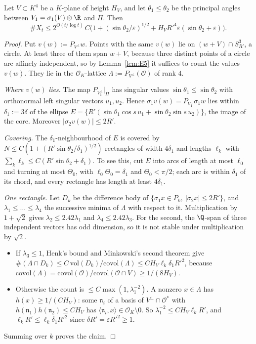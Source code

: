 \begin{lemma}\label{lem:G1}
Let $V\subset K^4$ be a $K$-plane of height $H_V$, and let $\theta_1\le\theta_2$ be the principal angles between
$V_1=\sigma_1(V)\otimes\R$ and $\Pi$. Then
\[
\#X_t\le2^{O(t/\log t)}\,C\big(1+(\sin\theta_2/\varepsilon)^{1/2}+H_VR'^4\varepsilon(\sin\theta_2+\varepsilon)\big).
\]
\end{lemma}
\begin{proof}
Put $v(w):=P_{V^\perp}w$. Points with the same $v(w)$ lie on $(w+V)\cap S^3_{R'}$, a circle. At least three of them span $w+V$, because
three distinct points of a circle are affinely independent, so by Lemma~\ref{lem:E5} it suffices to count the values $v(w)$. They lie in the $\mathcal O_K$-lattice
$\Lambda:=P_{V^\perp}(\mathcal O)$ of rank $4$.

\emph{Where $v(w)$ lies.} The map $P_{V_1^\perp}|_\Pi$ has singular values $\sin\theta_1\le\sin\theta_2$ with
orthonormal left singular vectors $u_1,u_2$. Hence $\sigma_1v(w)=P_{V_1^\perp}\sigma_1w$ lies within
$\delta_1:=3\delta$ of the ellipse $E=\{R'(\sin\theta_1\cos s\,u_1+\sin\theta_2\sin s\,u_2)\}$, the image of the
core. Moreover $|\sigma_2v(w)|\le2R'$.

\emph{Covering.} The $\delta_1$-neighbourhood of $E$ is covered by
$N\le C(1+(R'\sin\theta_2/\delta_1)^{1/2})$ rectangles of width $4\delta_1$ and lengths $\ell_k$ with
$\sum_k\ell_k\le C(R'\sin\theta_2+\delta_1)$. To see this, cut $E$ into arcs of length at most
$\ell_0$ and turning at most $\Theta_0$, with $\ell_0\Theta_0=\delta_1$ and $\Theta_0<\pi/2$; each arc is within $\delta_1$
of its chord, and every rectangle has length at least $4\delta_1$.

\emph{One rectangle.} Let $D_k$ be the difference body of $\{\sigma_1x\in P_k,\ |\sigma_2x|\le2R'\}$, and
$\lambda_1\le\dots\le\lambda_4$ the successive minima of $\Lambda$ with respect to it. Multiplication by
$1+\sqrt2$ gives $\lambda_2\le2.42\lambda_1$ and $\lambda_4\le2.42\lambda_3$. For the second, the $\Q$-span of three
independent vectors has odd dimension, so it is not stable under multiplication by $\sqrt2$.
\begin{itemize}\setlength\itemsep{0pt}
\item If $\lambda_3\le1$, Henk's bound and Minkowski's second theorem give
$\#(\Lambda\cap D_k)\le C\,\mathrm{vol}(D_k)/\mathrm{covol}(\Lambda)\le CH_V\ell_k\delta_1R'^2$, because
$\mathrm{covol}(\Lambda)=\mathrm{covol}(\mathcal O)/\mathrm{covol}(\mathcal O\cap V)\ge1/(8H_V)$.
\item Otherwise the count is $\le C\max(1,\lambda_1^{-2})$. A nonzero $x\in\Lambda$ has $h(x)\ge1/(CH_V)$:
some $\mathfrak n_i$ of a basis of $V^\perp\cap\mathcal O^*$ with $h(\mathfrak n_1)h(\mathfrak n_2)\le CH_V$
has $\langle\mathfrak n_i,x\rangle\in\mathcal O_K\setminus0$. So $\lambda_1^{-2}\le CH_V\ell_kR'$, and
$\ell_kR'\le\ell_k\delta_1R'^2$ since $\delta R'=\varepsilon R'^2\ge1$.
\end{itemize}
Summing over $k$ proves the claim.
\end{proof}


